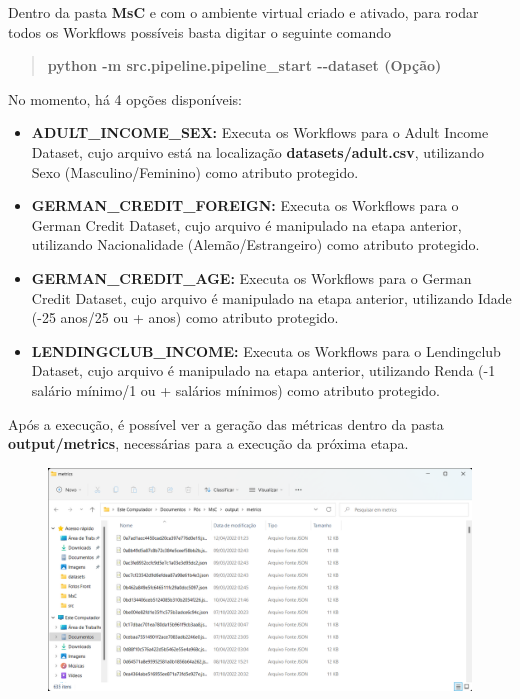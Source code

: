 \documentclass[portugues]{ic-tese}
\begin{document}
Dentro da pasta \textbf{MsC} e com o ambiente virtual criado e ativado, para rodar todos os Workflows possíveis basta digitar o seguinte comando

\begin{quote}\textbf{python -m src.pipeline.pipeline\_start -{}-dataset (Opção)}\end{quote}

No momento, há 4 opções disponíveis:

\begin{itemize}
    \item {\textbf{ADULT\_INCOME\_SEX:}} Executa os Workflows para o Adult Income Dataset, cujo arquivo está na localização \textbf{datasets/adult.csv}, utilizando Sexo (Masculino/Feminino) como atributo protegido.
    \item {\textbf{GERMAN\_CREDIT\_FOREIGN:}} Executa os Workflows para o German Credit Dataset, cujo arquivo é manipulado na etapa anterior, utilizando Nacionalidade (Alemão/Estrangeiro) como atributo protegido.
    \item {\textbf{GERMAN\_CREDIT\_AGE:}} Executa os Workflows para o German Credit Dataset, cujo arquivo é manipulado na etapa anterior, utilizando Idade (-25 anos/25 ou + anos) como atributo protegido.
    \item {\textbf{LENDINGCLUB\_INCOME:}} Executa os Workflows para o Lendingclub Dataset, cujo arquivo é manipulado na etapa anterior, utilizando Renda (-1 salário mínimo/1 ou + salários mínimos) como atributo protegido.
\end{itemize}

Após a execução, é possível ver a geração das métricas dentro da pasta \textbf{output/metrics}, necessárias para a execução da próxima etapa.

\begin{figure}[H]
\centering
\includegraphics[scale=0.25]{images/doc-install/metrics.png}
\label{fig:DocInstallMetrics}
\end{figure}
\end{document}
